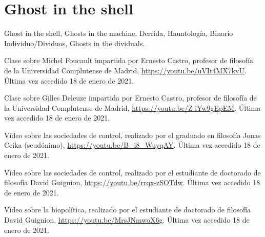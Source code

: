 \documentclass[11pt]{article}
\begin{document}
\section{Ghost in the shell}
Ghost in the shell, Ghosts in the machine, Derrida, Hauntología, Binario Individuo/Dividuos, Ghosts in the dividuals.
\begin{thebibliography}{8}
        Clase sobre Michel Foucault impartida por Ernesto Castro, profesor de filosofía de la Universidad Complutense de Madrid, \url{https://youtu.be/uVIt4MX7kvU}. Última vez accedido 18 de enero de 2021.

        Clase sobre Gilles Deleuze impartida por Ernesto Castro, profesor de filosofía de la Universidad Complutense de Madrid, \url{https://youtu.be/Z-iYw9gEpEM}. Última vez accedido 18 de enero de 2021.

        Vídeo sobre las sociedades de control, realizado por el graduado en filosofía Jonas Ceika (seudónimo), \url{https://youtu.be/B_i8_WuyqAY}. Última vez accedido 18 de enero de 2021.

        Vídeo sobre las sociedades de control, realizado por el estudiante de doctorado de filosofía David Guignion, \url{https://youtu.be/rrqx-zSOTdw}. Última vez accedido 18 de enero de 2021.

        Vídeo sobre la biopolítica, realizado por el estudiante de doctorado de filosofía David Guignion, \url{https://youtu.be/MrsJNmwoX6g}. Última vez accedido 18 de enero de 2021.
\end{thebibliography}
\end{document}
